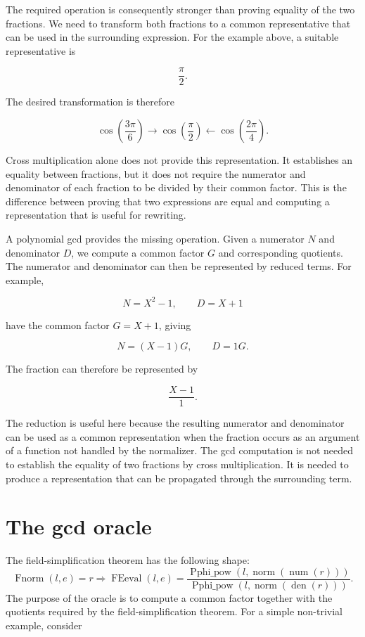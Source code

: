 \documentclass[11pt]{article}
\begin{document}
The required operation is consequently stronger than proving equality of
the two fractions. We need to transform both fractions to a common
representative that can be used in the surrounding expression. For the
example above, a suitable representative is

$$
  \frac{\pi}{2}.
$$

The desired transformation is therefore

$$
  \cos\left(\frac{3\pi}{6}\right)
  \longrightarrow
  \cos\left(\frac{\pi}{2}\right)
  \longleftarrow
  \cos\left(\frac{2\pi}{4}\right).
$$

Cross multiplication alone does not provide this representation. It
establishes an equality between fractions, but it does not require the
numerator and denominator of each fraction to be divided by their common
factor. This is the difference between proving that two expressions are
equal and computing a representation that is useful for rewriting.

A polynomial gcd provides the missing operation. Given a numerator
$N$ and denominator $D$, we compute a common factor $G$ and corresponding
quotients. The numerator and denominator can then be represented by
reduced terms. For example,

$$
  N=X^2-1,\qquad D=X+1
$$

have the common factor $G=X+1$, giving

$$
  N=(X-1)G,\qquad D=1G.
$$

The fraction can therefore be represented by

$$
  \frac{X-1}{1}.
$$

The reduction is useful here because the resulting numerator and
denominator can be used as a common representation when the fraction occurs
as an argument of a function not handled by the normalizer. The gcd computation is not needed to establish
the equality of two fractions by cross multiplication. It is needed to
produce a representation that can be propagated through the surrounding
term.


\section{The gcd oracle}
The field-simplification theorem has the following shape:
\[
 \operatorname{Fnorm}(l,e)=r \Longrightarrow
 \operatorname{FEeval}(l,e)=
 \frac{\operatorname{Pphi\_pow}(l,\operatorname{norm}(\operatorname{num}(r)))}
  {\operatorname{Pphi\_pow}(l,\operatorname{norm}(\operatorname{den}(r)))}.
\]
The purpose of the oracle is to compute a common factor together with the
quotients required by the field-simplification theorem. For a simple
non-trivial example, consider
\end{document}
